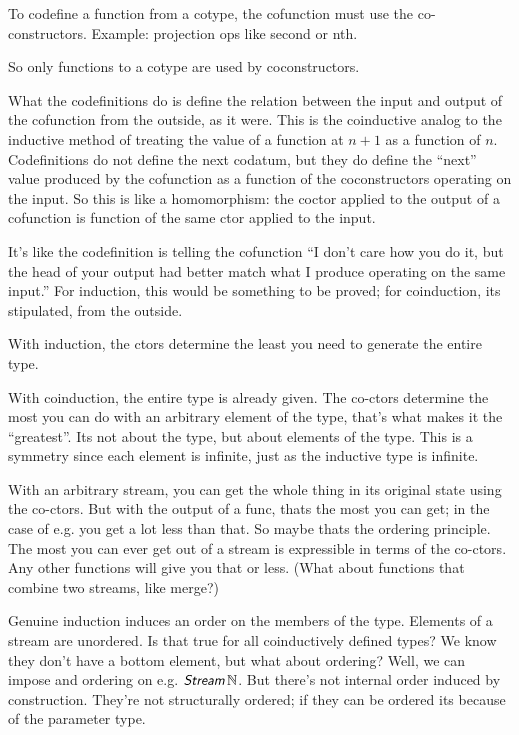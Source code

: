 \documentclass{article}
\begin{document}
To codefine a function from a cotype, the cofunction must use the
co-constructors. Example: projection ops like \textsf{second} or
\textsf{nth}.

So only functions to a cotype are used by coconstructors.

What the codefinitions do is define the relation between the input and
output of the cofunction from the outside, as it were. This is the
coinductive analog to the inductive method of treating the value of a
function at \(n+1\) as a function of \(n\). Codefinitions do not
define the next codatum, but they do define the ``next'' value
produced by the cofunction as a function of the coconstructors
operating on the input. So this is like a homomorphism: the coctor
applied to the output of a cofunction is function of the same ctor
applied to the input.

It's like the codefinition is telling the cofunction ``I don't care
how you do it, but the head of your output had better match what I
produce operating on the same input.'' For induction, this would be
something to be proved; for coinduction, its stipulated, from the
outside.

With induction, the ctors determine the least you need to generate the
entire type.

With coinduction, the entire type is already given. The co-ctors
determine the most you can do with an arbitrary element of the type,
that's what makes it the ``greatest''. Its not about the type, but
about elements of the type. This is a symmetry since each element is
infinite, just as the inductive type is infinite.

With an arbitrary stream, you can get the whole thing in its original
state using the co-ctors. But with the output of a func, thats the
most you can get; in the case of e.g.  you get a lot less
than that. So maybe thats the ordering principle. The most you can
ever get out of a stream is expressible in terms of the co-ctors. Any
other functions will give you that or less. (What about functions that
combine two streams, like merge?)

Genuine induction induces an order on the members of the type.
Elements of a stream are unordered. Is that true for all coinductively
defined types? We know they don't have a bottom element, but what
about ordering? Well, we can impose and ordering on e.g.
\(\Stream\,\Nat\). But there's not internal order induced by
construction. They're not structurally ordered; if they can be ordered
its because of the parameter type.
\end{document}
